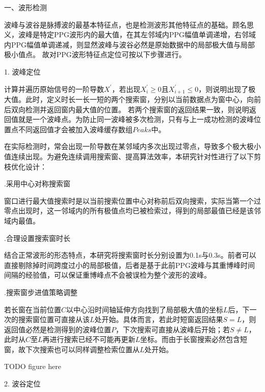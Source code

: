 一、波形检测

波峰与波谷是脉搏波的最基本特征点，也是检测波形其他特征点的基础。顾名思义，波峰是特定PPG波形内的最大值，在其左邻域内PPG幅值单调递增，右邻域内PPG幅值单调递减，则显然波峰与波谷必然是原始数据中的局部极大值与局部极小值点。
故对PPG波形特征点定位可按以下步骤进行。

1. 波峰定位

计算并遍历原始信号的一阶导数$X^{'}$，若出现$X_i^{'}\ge 0$且$X_{i+1}^{'}\le 0$，则说明出现了极大值。此时，定义时长一长一短的两个搜索窗，分别以当前数据点为窗中心，向前后双向检测并返回窗内最大值的位置。
若两个搜索窗的返回结果一致，则说明返回值就是一个波峰点。为防止同一波峰被多次检测，只有与上一成功检测的波峰位置点不同返回值才会被加入波峰缓存数组$Peaks$中。

在实际检测时，常会出现一阶导数在某邻域内多次出现过零点，导致多个极大极小值连续出现。为避免连续调用搜索窗、提高算法效率，本研究针对性进行了以下剪枝优化设计：

.采用中心对称搜索窗

窗口进行最大值搜索时是以当前搜索位置中心对称前后双向搜索，实际当第一个过零点出现时，这一邻域内的所有极值点均已被检索过，得到的局部最值已经是该邻域内最值。

.合理设置搜索窗时长

结合正常波形的形态特点，本研究将搜索窗时长分别设置为0.1s与0.3s。前者可以直接剔除掉时间跨度过小的局部极值，后者是基于此前PPG波峰与其重博峰时间间隔的经验值，可以保证重博峰点不会被误检为整个波形的波峰。

.搜索窗步进值策略调整

若长窗在当前位置$C$以中心沿时间轴延伸方向找到了局部极大值的坐标$L$后，下一次的搜索窗位置可直接从该$L$处开始。具体而言，若此时短窗返回结果$S=L$，则返回值必然是检测得到的波峰位置$P$，下次搜索可直接从波峰后开始；若$S\ne L$，
此时从$C$至$L$再进行搜索已经不可能再更新$L$坐标。而由于长窗搜索必然包含短窗，故下次搜索也可以同样调整检索位置从$L$处开始。

TODO 
figure here

2. 波谷定位

